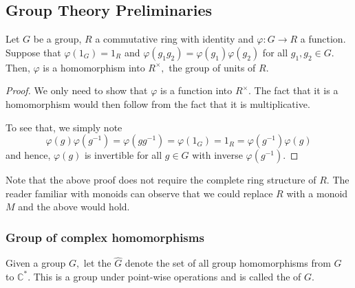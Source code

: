 %
%
\subsection{Group Theory Preliminaries}
\begin{lem} \label{lem:determininggrouphomoring}
	Let $G$ be a group, $R$ a commutative ring with identity and $\varphi : G \to R$ a function. Suppose that $\varphi\left(1_G\right) = 1_R$ and $\varphi(g_1g_2) = \varphi(g_1)\varphi(g_2)$ for all $g_1, g_2 \in G.$ Then, $\varphi$ is a homomorphism into $R^\times,$ the group of units of $R.$
\end{lem}
\begin{proof} 
	We only need to show that $\varphi$ is a function into $R^\times.$ The fact that it is a homomorphism would then follow from the fact that it is multiplicative.

	To see that, we simply note 
	\begin{equation*} 
		\varphi(g)\varphi(g^{-1}) = \varphi(gg^{-1}) = \varphi\left(1_G\right) = 1_R = \varphi(g^{-1})\varphi(g)
	\end{equation*}
	and hence, $\varphi(g)$ is invertible for all $g \in G$ with inverse $\varphi(g^{-1}).$
\end{proof}

\begin{rem} \label{rem:monoidhomo}
	Note that the above proof does not require the complete ring structure of $R.$ The reader familiar with monoids can observe that we could replace $R$ with a monoid $M$ and the above would hold.
\end{rem}

\subsubsection{Group of complex homomorphisms}
\begin{defn} \label{defn:dualgroup}
	Given a group $G,$ let the $\widehat{G}$ denote the set of all group homomorphisms from $G$ to $\mathbb{C}^*.$ This is a group under point-wise operations and is called the  of $G.$
\end{defn}

